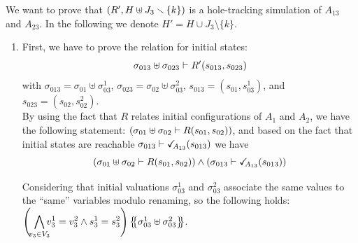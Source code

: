 \documentclass[runningheads]{llncs}
\begin{document}
We want to prove that ${\left(R', H\uplus J_3 \smallsetminus\{k\}\right)}$ is a hole-tracking simulation of $A_{13}$ and $A_{23}$. In the following we denote $H'=H\cup J_3 \setminus\{k\}$.
\begin{enumerate}
\item First, we have to prove the relation for initial states:
\[\sigma_{013} \uplus \sigma_{023} \vdash R'{\left(s_{013}, s_{023}\right)}\]
with $\sigma_{013} = \sigma_{01} \uplus \sigma_{03}^1$, $\sigma_{023} = \sigma_{02} \uplus \sigma_{03}^2$, $s_{013}=(s_{01},s_{03}^1)$, and $s_{023}=(s_{02},s_{02}^2)$.\\
By using the fact that $R$ relates initial configurations of  $A_1$ and $A_2$, we have  the following statement:
${\left(\sigma_{01} \uplus \sigma_{02} \vdash R{\left(s_{01}, s_{02}\right)}\right)}$,  and based on the  fact that initial states are reachable $\sigma_{013} \vdash \checkmark_{\!\! A_{13}}{\left(s_{013}\right)}$ we have 
\[ {\left(\sigma_{01} \uplus \sigma_{02} \vdash R{\left(s_{01}, s_{02}\right)}\right)} \wedge 
{\left(\sigma_{013} \vdash \checkmark_{\!\! A_{13}}{\left(s_{013}\right)}\right)}\]

Considering that initial valuations $\sigma_{03}^1$ and $\sigma_{03}^2$ associate the same values to the ``same'' variables modulo renaming, so the following holds:\\ $\left(\,\,{\displaystyle \bigwedge_\subbox{v_3\in V_3} v^1_3=v^2_3\wedge s^1_3 = s^2_3}\right)\psubst{\sigma_{03}^1 \uplus \sigma_{03}^2 }$.


\end{enumerate}
\end{document}

